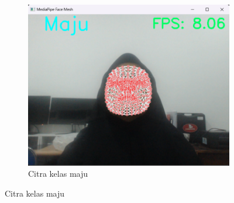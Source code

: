\begin{figure}[H]
  \hfill
  \begin{subfigure}{0.3\textwidth}
      \centering
      \includegraphics[width=\linewidth]{gambar/110 maju.png}
      \caption{Citra kelas maju}
      \label{fig:image3}
  \end{subfigure}
  

\end{figure}
